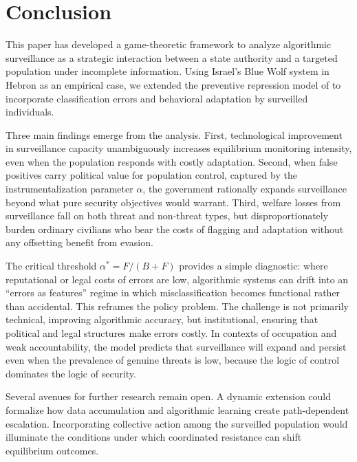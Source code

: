 \documentclass[11pt,a4paper]{article}
\theoremstyle{definition}
\theoremstyle{remark}
\theoremstyle{definition}
\begin{document}
\section{Conclusion}

This paper has developed a game-theoretic framework to analyze algorithmic surveillance as a strategic interaction between a state authority 
and a targeted population under incomplete information. Using Israel's Blue Wolf system in Hebron as an empirical case, we extended the 
preventive repression model of \citet{dragu2021digital} to incorporate classification errors and behavioral adaptation by surveilled individuals. 

Three main findings emerge from the analysis. First, technological improvement in surveillance capacity unambiguously increases equilibrium 
monitoring intensity, even when the population responds with costly adaptation. Second, when false positives carry political value for 
population control, captured by the instrumentalization parameter $\alpha$, the government rationally expands surveillance beyond what pure 
security objectives would warrant. Third, welfare losses from surveillance fall on both threat and non-threat types, but disproportionately 
burden ordinary civilians who bear the costs of flagging and adaptation without any offsetting benefit from evasion. 

The critical threshold $\alpha^* = F/(B+F)$ provides a simple diagnostic: where reputational or legal costs of errors are low, algorithmic 
systems can drift into an ``errors as features'' regime in which misclassification becomes functional rather than accidental. This reframes 
the policy problem. The challenge is not primarily technical, improving algorithmic accuracy, but institutional, ensuring that political and 
legal structures make errors costly. In contexts of occupation and weak accountability, the model predicts that surveillance will expand and 
persist even when the prevalence of genuine threats is low, because the logic of control dominates the logic of security. 

Several avenues for further research remain open. A dynamic extension could formalize how data accumulation and algorithmic learning create 
path-dependent escalation. Incorporating collective action among the surveilled population would illuminate the conditions under which 
coordinated resistance can shift equilibrium outcomes. 

\newpage

\end{document}
